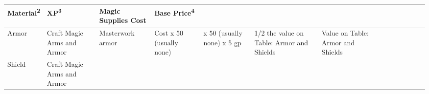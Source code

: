 \begin{longtable}{llllllllllllll}
{\begin{minipage}[t]{0.039in}
\textbf{Material}\textsuperscript{\textbf{2}}\textbf{ }\end{minipage}} & \multicolumn{1}{p{0.039in}|}{\begin{minipage}[t]{0.039in}\raggedright
\textbf{XP}\textsuperscript{\textbf{3}}\textbf{ }\end{minipage}} & \multicolumn{1}{p{0.039in}|}{\begin{minipage}[t]{0.039in}\raggedright
\textbf{Magic Supplies Cost }\end{minipage}} & \multicolumn{2}{p{0.079in}|}{\begin{minipage}[t]{0.079in}\raggedright
\textbf{Base Price}\textsuperscript{\textbf{4}}\end{minipage}}\\
\hline
\multicolumn{1}{|p{0.472in}|}{\begin{minipage}[t]{0.472in}\centering
Armor \end{minipage}} & \multicolumn{1}{p{0.639in}|}{\begin{minipage}[t]{0.639in}\raggedright
Craft Magic Arms and Armor\end{minipage}} & \multicolumn{1}{p{0.497in}|}{\begin{minipage}[t]{0.497in}\raggedright
Masterwork armor \end{minipage}} & \multicolumn{1}{p{0.564in}|}{\begin{minipage}[t]{0.564in}\raggedright
Cost x 50 (usually none)\end{minipage}} & \multicolumn{1}{p{0.544in}|}{\begin{minipage}[t]{0.544in}\raggedright
x 50 (usually none) \linebreak
x 5 gp\end{minipage}} & \multicolumn{1}{p{0.739in}|}{\begin{minipage}[t]{0.739in}\raggedright
1/2 the value on Table: Armor and Shields\end{minipage}} & \multicolumn{1}{p{0.768in}|}{\begin{minipage}[t]{0.768in}\raggedright
Value on Table: Armor and Shields\end{minipage}}\\
\hline
\multicolumn{1}{p{0.039in}|}{\begin{minipage}[t]{0.039in}\centering
Shield  \end{minipage}} & \multicolumn{1}{p{0.039in}|}{\begin{minipage}[t]{0.039in}\raggedright
Craft Magic Arms and Armor\end{minipage}} & \multicolumn{1}{p{0.039in}|}{\begin{minipage}[t]{0.039in}\raggedright

\end{minipage}}
\end{longtable}
